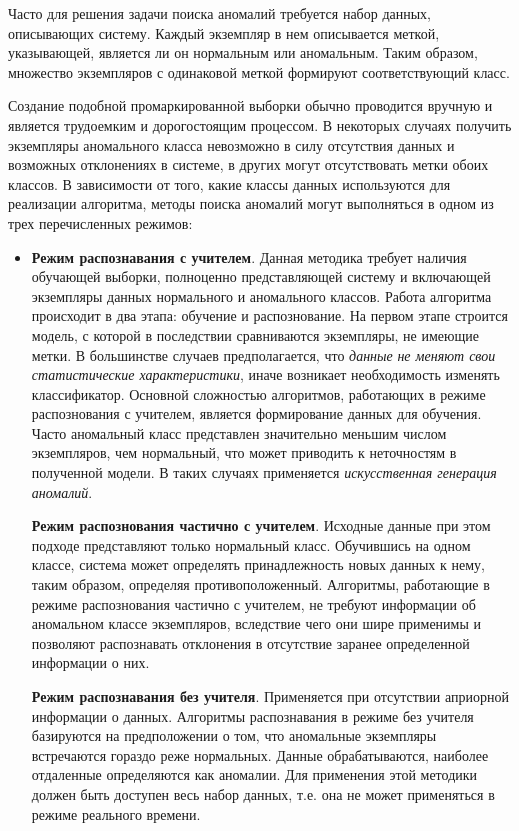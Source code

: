\documentclass[%
	11pt,
	a4paper,
	utf8,
		]{article}
\begin{document}
Часто для решения задачи поиска аномалий требуется набор данных, описывающих систему. Каждый экземпляр в нем описывается меткой, указывающей, является ли он нормальным или аномальным. Таким образом, множество экземпляров с одинаковой меткой формируют соответствующий класс. 

Создание подобной промаркированной выборки обычно проводится вручную и является трудоемким и дорогостоящим процессом. В некоторых случаях получить экземпляры аномального класса невозможно в силу отсутствия данных и возможных отклонениях в системе, в других могут отсутствовать метки обоих классов. В зависимости от того, какие классы данных используются для реализации алгоритма, методы поиска аномалий могут выполняться в одном из трех перечисленных режимов:
\begin{itemize}
	\item \textbf{Режим распознавания с учителем}. Данная методика требует наличия обучающей выборки, полноценно представляющей систему и включающей экземпляры данных нормального и аномального классов. Работа алгоритма происходит в два этапа: обучение и распознование. На первом этапе строится модель, с которой в последствии сравниваются экземпляры, не имеющие метки. В большинстве случаев предполагается, что \emph{данные} \emph{не меняют свои статистические характеристики}, иначе возникает необходимость изменять классификатор. Основной сложностью алгоритмов, работающих в режиме распознования с учителем, является формирование данных для обучения. Часто аномальный класс представлен значительно меньшим числом экземпляров, чем нормальный, что может приводить к неточностям в полученной модели. В таких случаях применяется \emph{искусственная генерация аномалий}.
	
	\textbf{Режим распознования частично с учителем}. Исходные данные при этом подходе представляют только нормальный класс. Обучившись на одном классе, система может определять принадлежность новых данных к нему, таким образом, определяя противоположенный. Алгоритмы, работающие в режиме распознования частично с учителем, не требуют информации об аномальном классе экземпляров, вследствие чего они шире применимы и позволяют распознавать отклонения в отсутствие заранее определенной информации о них.
	
	\textbf{Режим распознавания без учителя}. Применяется при отсутствии априорной информации о данных. Алгоритмы распознавания в режиме без учителя базируются на предположении о том, что аномальные экземпляры встречаются гораздо реже нормальных. Данные обрабатываются, наиболее отдаленные определяются как аномалии. Для применения этой методики должен быть доступен весь набор данных, т.е. она не может применяться в режиме реального времени.
\end{itemize}
\end{document}
